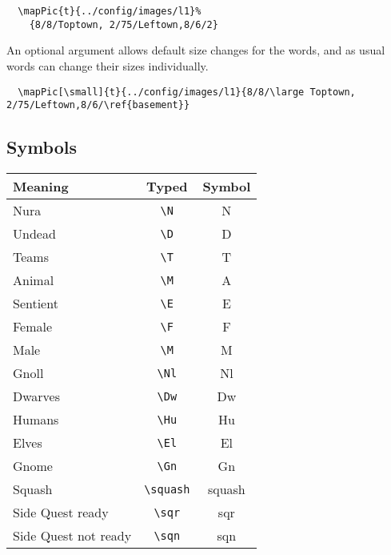 \documentclass[a4paper,openany]{book}
\begin{document}
\begin{multicols}{2}
\begin{verbatim}
  \mapPic{t}{../config/images/l1}%
    {8/8/Toptown, 2/75/Leftown,8/6/2}
\end{verbatim}

An optional argument allows default size changes for the words, and as usual words can change their sizes individually.

\begin{verbatim}
  \mapPic[\small]{t}{../config/images/l1}{8/8/\large Toptown, 2/75/Leftown,8/6/\ref{basement}}
\end{verbatim}

\subsection{Symbols}

\begin{tabularx}{\linewidth}{Xcc}

  Meaning & Typed & Symbol \\\hline

  Nura & {\tt \textbackslash{N}} & \gls{N} \\

  Undead & {\tt \textbackslash{D}} & \gls{D} \\
  \hline
  Teams & {\tt \textbackslash{T}} & \gls{T} \\

  Animal & {\tt \textbackslash{M}} & \gls{A} \\

  Sentient & {\tt \textbackslash{E}} & \gls{E} \\

  Female & {\tt \textbackslash{F}} & \gls{F} \\

  Male & {\tt \textbackslash{M}} & \gls{M} \\

  \hline
  Gnoll & {\tt \textbackslash{Nl}} & \gls{Nl} \\

  Dwarves & {\tt \textbackslash{Dw}} & \gls{Dw} \\

  Humans & {\tt \textbackslash{Hu}} & \gls{Hu} \\

  Elves & {\tt \textbackslash{El}} & \gls{El} \\

  Gnome & {\tt \textbackslash{Gn}} & \gls{Gn} \\
  \hline
  Squash & {\tt \textbackslash{squash}} & \gls{squash} \\

  Side Quest ready & {\tt \textbackslash{sqr}} & \gls{sqr} \\

  Side Quest not ready & {\tt \textbackslash{sqn}} & \gls{sqn} \\

\end{tabularx}

\end{multicols}
\end{document}
